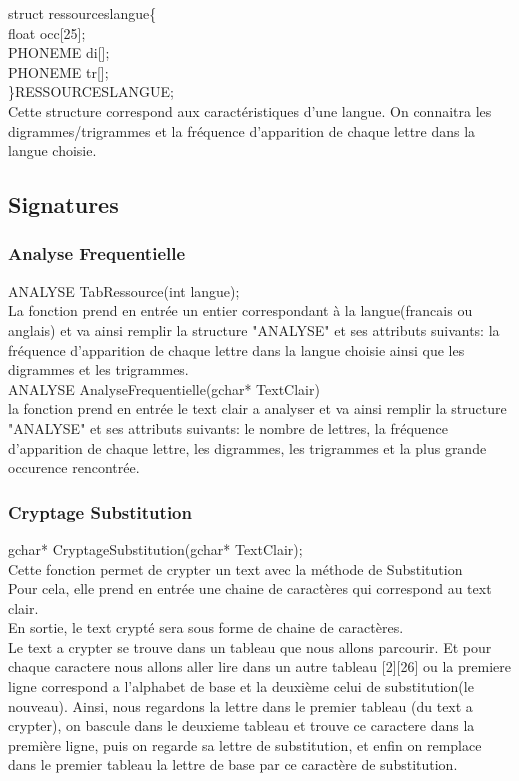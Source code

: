 \documentclass[a4]{article}
\begin{document}
	struct ressourceslangue\{ \\
		float occ[25];\\
		PHONEME di[];\\
		PHONEME tr[];\\
	\}RESSOURCESLANGUE;\\
	Cette structure correspond aux caractéristiques d'une langue. On connaitra
	les digrammes/trigrammes et la fréquence d'apparition de chaque lettre dans la langue choisie.
		\subsection{Signatures}
		
	
	\subsubsection{Analyse Frequentielle}
	ANALYSE TabRessource(int langue);\\
		La fonction prend en entrée un entier correspondant à la langue(francais ou anglais)
		et va ainsi remplir la structure "ANALYSE" et ses attributs suivants:
		la fréquence d'apparition de chaque lettre dans la langue choisie ainsi que les digrammes
		et les trigrammes.\\
		
		
		
	ANALYSE AnalyseFrequentielle(gchar* TextClair)\\
		la fonction prend en entrée le text clair a analyser et va ainsi remplir la structure "ANALYSE" et 
		ses attributs suivants:
		le nombre de lettres, la fréquence d'apparition de chaque lettre, les digrammes, les trigrammes
		et la plus grande occurence rencontrée.\\
		
	\subsubsection{Cryptage Substitution}
	gchar* CryptageSubstitution(gchar* TextClair);\\
		Cette fonction permet de crypter un text avec la méthode de Substitution\\
		Pour cela, elle prend en entrée une chaine de caractères qui correspond au text clair.\\
		En sortie, le text crypté sera sous forme de chaine de caractères.\\
		Le text a crypter se trouve dans un tableau que nous allons parcourir. Et pour chaque caractere 
		nous allons aller lire dans un autre tableau [2][26] ou la premiere ligne correspond a l'alphabet
		de base et la deuxième celui de substitution(le nouveau). Ainsi, nous regardons la lettre dans 
		le premier tableau (du text a crypter), on bascule dans le deuxieme tableau et trouve ce caractere dans la
		première ligne, puis on regarde sa lettre de substitution, et enfin on remplace dans le premier tableau 
		la lettre de base par ce caractère de substitution.
		
\end{document}
